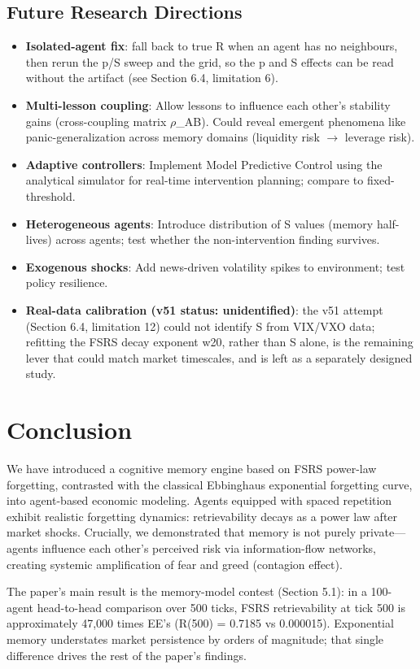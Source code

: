 \documentclass[11pt]{article}
\begin{document}
\subsection{Future Research Directions}
\begin{itemize}
\item \textbf{Isolated-agent fix}: fall back to true R when an agent has no neighbours, then rerun the p/S sweep and the grid, so the p and S effects can be read without the artifact (see Section 6.4, limitation 6).
\item \textbf{Multi-lesson coupling}: Allow lessons to influence each other's stability gains (cross-coupling matrix $\rho$\_AB). Could reveal emergent phenomena like panic-generalization across memory domains (liquidity risk $\rightarrow$ leverage risk).
\item \textbf{Adaptive controllers}: Implement Model Predictive Control using the analytical simulator for real-time intervention planning; compare to fixed-threshold.
\item \textbf{Heterogeneous agents}: Introduce distribution of S values (memory half-lives) across agents; test whether the non-intervention finding survives.
\item \textbf{Exogenous shocks}: Add news-driven volatility spikes to environment; test policy resilience.
\item \textbf{Real-data calibration (v51 status: unidentified)}: the v51 attempt (Section 6.4, limitation 12) could not identify S from VIX/VXO data; refitting the FSRS decay exponent w20, rather than S alone, is the remaining lever that could match market timescales, and is left as a separately designed study.
\end{itemize}

\section{Conclusion}
We have introduced a cognitive memory engine based on FSRS power-law forgetting, contrasted with the classical Ebbinghaus exponential forgetting curve, into agent-based economic modeling. Agents equipped with spaced repetition exhibit realistic forgetting dynamics: retrievability decays as a power law after market shocks. Crucially, we demonstrated that memory is not purely private---agents influence each other's perceived risk via information-flow networks, creating systemic amplification of fear and greed (contagion effect).

The paper's main result is the memory-model contest (Section 5.1): in a 100-agent head-to-head comparison over 500 ticks, FSRS retrievability at tick 500 is approximately 47,000 times EE's (R(500) = 0.7185 vs 0.000015). Exponential memory understates market persistence by orders of magnitude; that single difference drives the rest of the paper's findings.
\end{document}
